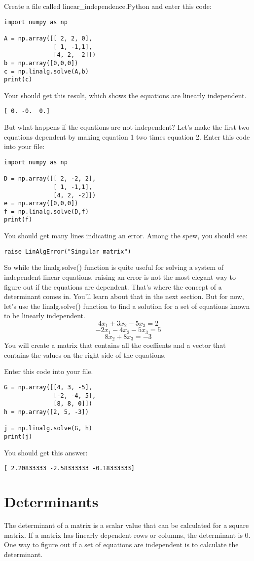 Create a file called linear\_independence.Python and enter this code:
\begin{Verbatim}
import numpy as np

A = np.array([[ 2, 2, 0], 
              [ 1, -1,1],
              [4, 2, -2]])
b = np.array([0,0,0])
c = np.linalg.solve(A,b)
print(c)
\end{Verbatim}
Your should get this result, which shows the equations are linearly independent.
\begin{Verbatim}
[ 0. -0.  0.]
\end{Verbatim}
But what happens if the equations are not independent? Let's make the first two equations dependent by making equation 1 two times equation 2. Enter this code into your file:
\begin{Verbatim}
import numpy as np

D = np.array([[ 2, -2, 2], 
              [ 1, -1,1],
              [4, 2, -2]])
e = np.array([0,0,0])
f = np.linalg.solve(D,f)
print(f)
\end{Verbatim}
You should get many lines indicating an error. Among the spew, you should see:
\begin{Verbatim}
raise LinAlgError("Singular matrix")
\end{Verbatim}
So while the linalg.solve() function is quite useful for solving a system of independent linear equations, raising an error is not the most elegant way to figure out if the equations are dependent. That's where the concept of a determinant comes in. You'll learn about that in the next section. But for now, let's use the  linalg.solve() function to find a solution for a set of equations known to be linearly independent.
$$4x_1 + 3x_2 - 5x_3 = 2$$
$$-2x_1- 4x_2 - 5x_3 = 5$$
$$       8x_2 + 8x_3  = -3$$
You will create a matrix that contains all the coeffients and a vector that contains the values on the right-side of the equations. 

Enter this code into your file. 
\begin{Verbatim}
G = np.array([[4, 3, -5], 
              [-2, -4, 5], 
              [8, 8, 0]])
h = np.array([2, 5, -3])

j = np.linalg.solve(G, h)
print(j)
\end{Verbatim}
You should get this answer:
\begin{Verbatim}
[ 2.20833333 -2.58333333 -0.18333333]
\end{Verbatim}

\section{Determinants}
The determinant of a matrix is a scalar value that can be calculated for a square matrix. If a matrix has linearly dependent rows or columns, the determinant is 0. One way to figure out if a set of equations are independent is to calculate the determinant. 

